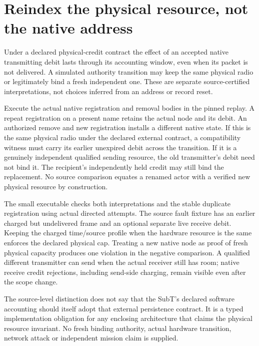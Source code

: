 \documentclass{article}
\begin{document}
\section*{Reindex the physical resource, not the native address}
Under a declared physical-credit contract the effect of an accepted
native transmitting debit lasts through its accounting window, even
when its packet is not delivered. A simulated authority transition
may keep the same physical radio or legitimately bind a fresh
independent one. These are separate source-certified interpretations,
not choices inferred from an address or record reset.

Execute the actual native registration and removal bodies in the
pinned replay. A repeat registration on a present name retains the
actual node and its debit. An authorized remove and new registration
installs a different native state. If this is the same physical
radio under the declared external contract, a compatibility witness
must carry its earlier unexpired debit across the transition.
If it is a genuinely independent qualified sending resource,
the old transmitter's debit need not bind it. The recipient's
independently held credit may still bind the replacement.
No source comparison equates a renamed actor with a verified
new physical resource by construction.

The small executable checks both interpretations and the stable
duplicate registration using actual directed attempts. The source
fault fixture has an earlier charged but undelivered frame and
an optional separate live receive debit. Keeping the charged
time/source profile when the hardware resource is the same
enforces the declared physical cap. Treating a new native node as
proof of fresh physical capacity produces one violation in the
negative comparison. A qualified different transmitter can
send when the actual receiver still has room; native receive
credit rejections, including send-side charging, remain visible
even after the scope change.

The source-level distinction does not say that the SubT's declared
software accounting should itself adopt that external persistence
contract. It is a typed implementation obligation for any enclosing
architecture that claims the physical resource invariant. No fresh
binding authority, actual hardware transition, network attack or
independent mission claim is supplied.
\end{document}
